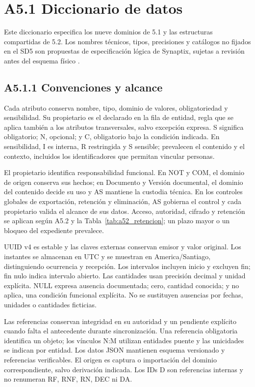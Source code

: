 \section*{A5.1 Diccionario de datos}

\label{anx:sd5_diccionario}

Este diccionario especifica los nueve dominios de 5.1 y las estructuras compartidas de 5.2. Los nombres técnicos, tipos, precisiones y catálogos no fijados en el SD5 son propuestas de especificación lógica de Synaptix, sujetas a revisión antes del esquema físico \parencites[RT-05.01]{pucv-bases-transversales}{synaptix-sd4}.

\subsection*{A5.1.1 Convenciones y alcance}

Cada atributo conserva nombre, tipo, dominio de valores, obligatoriedad y sensibilidad. Su propietario es el declarado en la fila de entidad, regla que se aplica también a los atributos transversales, salvo excepción expresa. S significa obligatorio; N, opcional; y C, obligatorio bajo la condición indicada. En sensibilidad, I es interna, R restringida y S sensible; prevalecen el contenido y el contexto, incluidos los identificadores que permitan vincular personas.

El propietario identifica responsabilidad funcional. En NOT y COM, el dominio de origen conserva sus hechos; en Documento y Versión documental, el dominio del contenido decide su uso y AS mantiene la custodia técnica. En los controles globales de exportación, retención y eliminación, AS gobierna el control y cada propietario valida el alcance de sus datos. Acceso, autoridad, cifrado y retención se aplican según A5.2 y la Tabla~\ref{tab:a52_retencion}; un plazo mayor o un bloqueo del expediente prevalece.

UUID v4 es estable y las claves externas conservan emisor y valor original. Los instantes se almacenan en UTC y se muestran en America/Santiago, distinguiendo ocurrencia y recepción. Los intervalos incluyen inicio y excluyen fin; fin nulo indica intervalo abierto. Las cantidades usan precisión decimal y unidad explícita. NULL expresa ausencia documentada; cero, cantidad conocida; y no aplica, una condición funcional explícita. No se sustituyen ausencias por fechas, unidades o cantidades ficticias.

Las referencias conservan integridad en su autoridad y un pendiente explícito cuando falta el antecedente durante sincronización. Una referencia obligatoria identifica un objeto; los vínculos N:M utilizan entidades puente y las unicidades se indican por entidad. Los datos JSON mantienen esquema versionado y referencias verificables. El origen es captura o importación del dominio correspondiente, salvo derivación indicada. Los IDs D son referencias internas y no renumeran RF, RNF, RN, DEC ni DA.


